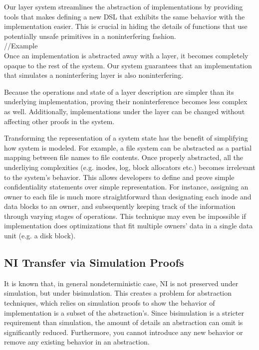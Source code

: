 Our layer system streamlines the abstraction of implementations by providing tools that makes defining a new DSL that exhibits the same behavior with the implementation easier.
This is crucial in hiding the details of functions that use potentially unsafe primitives in a noninterfering fashion.\\

//Example\\

Once an implementation is abstracted away with a layer, it becomes completely opaque to the rest of the system. Our system guarantees that an implementation that simulates a noninterfering layer is also noninterfering.

Because the operations and state of a layer description are simpler than its underlying implementation, proving their noninterference becomes less complex as well. Additionally, implementations under the layer can be changed without affecting other proofs in the system.

Transforming the representation of a system state has the benefit of simplifying how system is modeled. For example, a file system can be abstracted as a partial mapping between file names to file contents. Once properly abstracted, all the underliying complexities (e.g. inodes, log, block allocators etc.) becomes irrelevant to the system's behavior. This allows developers to define and prove simple confidentiality statements over simple representation. For instance, assigning an owner to each file is much more straightforward than designating each inode and data blocks to an owner, and subsequently keeping track of the information through varying stages of operations. This technique may even be impossible if implementation does optimizations that fit multiple owners' data in a single data unit (e.g. a disk block).

\subsection{NI Transfer via Simulation Proofs}
It is known that, in general nondeterministic case, NI is not preserved under simulation, but under bisimulation. This creates a problem for abstraction techniques, which relies on simulation proofs to show the behavior of implementation is a subset of the abstraction's. Since bisimulation is a stricter requirement than simulation, the amount of details an abstraction can omit is significantly reduced. Furthermore, you cannot introduce any new behavior or remove any existing behavior in an abstraction.

